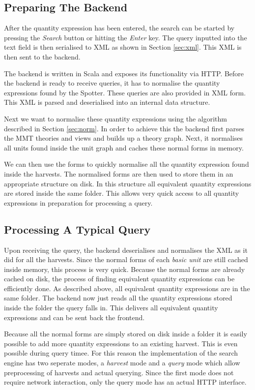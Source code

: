\subsection{Preparing The Backend}

After the quantity expression has been entered, the search can be started by pressing the \textit{Search} button or hitting the \textit{Enter} key. The query inputted into the text field is then serialised to XML as shown in Section \ref{sec:xml}. This XML is then sent to the backend.

The backend is written in Scala and exposes its functionality via HTTP. Before the backend is ready to receive queries, it has to normalise the quantity expressions found by the Spotter. These queries are also provided in XML form. This XML is parsed and deserialised into an internal data structure.

Next we want to normalise these quantity expressions using the algorithm described in Section \ref{sec:norm}. In order to achieve this the backend first parses the MMT theories and views and builds up a theory graph. Next, it normalises all units found inside the unit graph and caches these normal forms in memory.

We can then use the forms to quickly normalise all the quantity expression found inside the harvests. The normalised forms are then used to store them in an appropriate structure on disk. In this structure all equivalent quantity expressions are stored inside the same folder. This allows very quick access to all quantity expressions in preparation for processing a query.

\subsection{Processing A Typical Query}

Upon receiving the query, the backend deserialises and normalises the XML as it did for all the harvests. Since the normal forms of each \textit{basic unit} are still cached inside memory, this process is very quick. Because the normal forms are already cached on disk, the process of finding equivalent quantity expressions can be efficiently done. As described above, all equivalent quantity expressions are in the same folder. The backend now just reads all the quantity expressions stored inside the folder the query falls in. This delivers all equivalent quantity expressions and can be sent back the frontend.

Because all the normal forms are simply stored on disk inside a folder it is easily possible to add more quantity expressions to an existing harvest. This is even possible during query timee. For this reason the implementation of the search engine has two seperate modes, a \textit{harvest} mode and a \textit{query} mode which allow preprocessing of harvests and actual querying. Since the first mode does not require network interaction, only the query mode has an actual HTTP interface.

